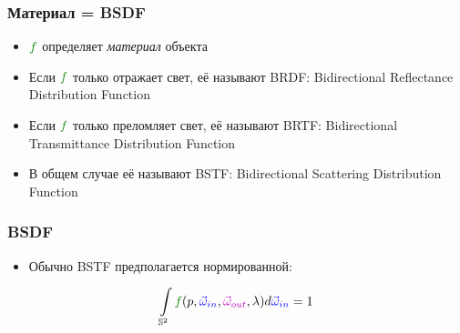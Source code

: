 \documentclass{beamer}
\begin{document}
\begin{frame}[fragile]
\frametitle{Материал = BSDF}
\begin{itemize}
\item \begin{math}{\color{green}f}\end{math} определяет \textit{материал} объекта
\pause 
\item Если \begin{math}{\color{green}f}\end{math} только отражает свет, её называют BRDF: Bidirectional Reflectance Distribution Function
\pause 
\item Если \begin{math}{\color{green}f}\end{math} только преломляет свет, её называют BRTF: Bidirectional Transmittance Distribution Function
\pause 
\item В общем случае её называют BSTF: Bidirectional Scattering Distribution Function
\end{itemize}
\end{frame}

\begin{frame}[fragile]
\frametitle{BSDF}
\begin{itemize}
\item Обычно BSTF предполагается нормированной:
\end{itemize}
\begin{equation}
\int\limits_{\mathbb S^2} {\color{green}f}(p, {\color{blue}\vec\omega_{in}}, {\color{magenta}\vec\omega_{out}}, \lambda) d{\color{blue}\vec\omega_{in}} = 1
\end{equation}
\end{frame}
\end{document}

